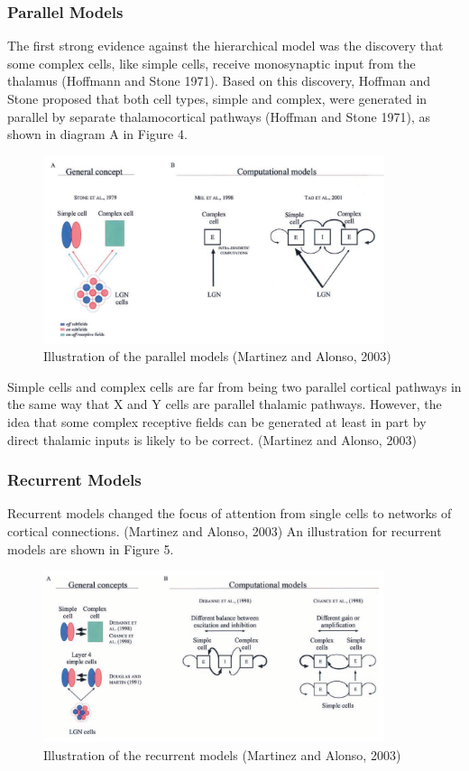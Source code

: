 \subsubsection{Parallel Models}
The first strong evidence against the hierarchical model was the discovery that some complex cells, like simple cells, receive monosynaptic input from the thalamus (Hoffmann and Stone 1971). Based on this discovery, Hoffman and Stone proposed that both cell types, simple and complex, were generated in parallel by separate thalamocortical pathways (Hoffman and Stone 1971), as shown in diagram A in Figure 4. 
\begin{figure}[H]
\centering
    \includegraphics[width=10cm]{figures/models/parallel-models.png}
     \caption{Illustration of the parallel models (Martinez and Alonso, 2003)}
\end{figure}

Simple cells and complex cells are far from being two parallel cortical pathways in the same way that X and Y cells are parallel thalamic pathways. However, the idea that some complex receptive fields can be generated at
least in part by direct thalamic inputs is likely to be correct. (Martinez and Alonso, 2003)

\subsubsection{Recurrent Models}
Recurrent models changed the focus of attention from single cells to networks of cortical connections. (Martinez and Alonso, 2003) An illustration for recurrent models are shown in Figure 5.

\begin{figure}[H]
\centering
    \includegraphics[width=10cm]{figures/models/recurrent-models.png}
     \caption{Illustration of the recurrent models (Martinez and Alonso, 2003)}
\end{figure}

